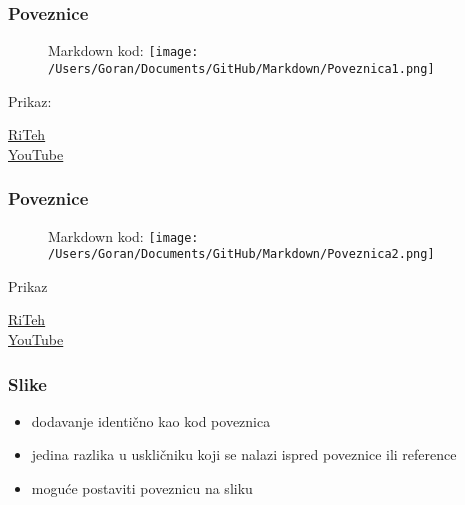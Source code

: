 \documentclass{beamer}
\begin{document}
\newpage

\begin{frame}
\frametitle{Poveznice}
\begin{figure}
{Markdown kod:} 
\texttt{[image: /Users/Goran/Documents/GitHub/Markdown/Poveznica1.png]}
\end{figure}

\begin{center}
Prikaz:
\end{center}



\href{http://www.riteh.uniri.hr/}{RiTeh} \\
\href{https://www.youtube.com/?gl=HR}{YouTube}
\end{frame}

\newpage

\begin{frame}
\frametitle{Poveznice}
\begin{figure}
{Markdown kod:} 
\texttt{[image: /Users/Goran/Documents/GitHub/Markdown/Poveznica2.png]}
\end{figure}

\begin{center}
Prikaz
\end{center}



\href{http://www.riteh.uniri.hr/}{RiTeh} \\
\href{https://www.youtube.com/?gl=HR}{YouTube}

\end{frame}

\newpage

\begin{frame}
\frametitle{Slike}
\begin{itemize}
\item dodavanje identično kao kod poveznica
\item jedina razlika u uskličniku koji se nalazi ispred poveznice ili reference
\item moguće postaviti poveznicu na sliku
\end{itemize}
\end{frame}

\newpage
\end{document}
